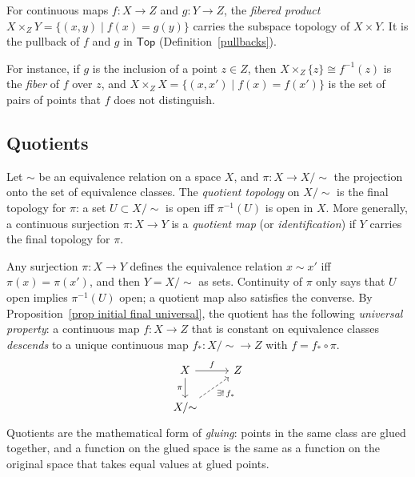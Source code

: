 \begin{defn}
    For continuous maps $f:X\to Z$ and $g:Y\to Z$, the \emph{fibered product} $X\times_ZY=\{(x,y)\mid f(x)=g(y)\}$ carries the subspace topology of $X\times Y$. It is the pullback of $f$ and $g$ in $\mathsf{Top}$ (Definition~\ref{pullbacks}).
\end{defn}

For instance, if $g$ is the inclusion of a point $z\in Z$, then $X\times_Z\{z\}\cong f^{-1}(z)$ is the \emph{fiber} of $f$ over $z$, and $X\times_ZX=\{(x,x')\mid f(x)=f(x')\}$ is the set of pairs of points that $f$ does not distinguish.

\subsection{Quotients}

\begin{defn}
    Let $\sim$ be an equivalence relation on a space $X$, and $\pi:X\to X/{\sim}$ the projection onto the set of equivalence classes. The \emph{quotient topology} on $X/{\sim}$ is the final topology for $\pi$: a set $U\subset X/{\sim}$ is open iff $\pi^{-1}(U)$ is open in $X$. More generally, a continuous surjection $\pi:X\to Y$ is a \emph{quotient map} (or \emph{identification}) if $Y$ carries the final topology for $\pi$.
\end{defn}

Any surjection $\pi:X\to Y$ defines the equivalence relation $x\sim x'$ iff $\pi(x)=\pi(x')$, and then $Y=X/{\sim}$ as sets. Continuity of $\pi$ only says that $U$ open implies $\pi^{-1}(U)$ open; a quotient map also satisfies the converse. By Proposition~\ref{prop initial final universal}, the quotient has the following \emph{universal property}: a continuous map $f:X\to Z$ that is constant on equivalence classes \emph{descends} to a unique continuous map $f_\ast:X/{\sim}\to Z$ with $f=f_\ast\circ\pi$.
\[\begin{tikzcd}
    X\arrow[r,"f"]\arrow[d,swap,"\pi"] & Z\\
    X/{\sim}\arrow[ur,dashed,swap,"\exists!\,f_\ast"] &
\end{tikzcd}\]
Quotients are the mathematical form of \emph{gluing}: points in the same class are glued together, and a function on the glued space is the same as a function on the original space that takes equal values at glued points.

